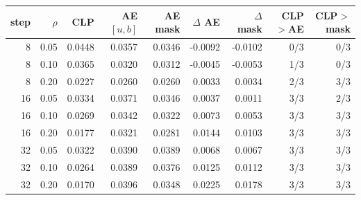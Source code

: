 \begin{tabular}{rrrrrrrrr}
\toprule
step & $\rho$ & CLP & AE $[u,b]$ & AE mask & $\Delta$ AE & $\Delta$ mask & CLP$>$AE & CLP$>$mask \\
\midrule
8 & 0.05 & 0.0448 & 0.0357 & 0.0346 & -0.0092 & -0.0102 & 0/3 & 0/3 \\
8 & 0.10 & 0.0365 & 0.0320 & 0.0312 & -0.0045 & -0.0053 & 1/3 & 0/3 \\
8 & 0.20 & 0.0227 & 0.0260 & 0.0260 & 0.0033 & 0.0034 & 2/3 & 3/3 \\
16 & 0.05 & 0.0334 & 0.0371 & 0.0346 & 0.0037 & 0.0011 & 3/3 & 2/3 \\
16 & 0.10 & 0.0269 & 0.0342 & 0.0322 & 0.0073 & 0.0053 & 3/3 & 3/3 \\
16 & 0.20 & 0.0177 & 0.0321 & 0.0281 & 0.0144 & 0.0103 & 3/3 & 3/3 \\
32 & 0.05 & 0.0322 & 0.0390 & 0.0389 & 0.0068 & 0.0067 & 3/3 & 3/3 \\
32 & 0.10 & 0.0264 & 0.0389 & 0.0376 & 0.0125 & 0.0112 & 3/3 & 3/3 \\
32 & 0.20 & 0.0170 & 0.0396 & 0.0348 & 0.0225 & 0.0178 & 3/3 & 3/3 \\
\bottomrule
\end{tabular}
